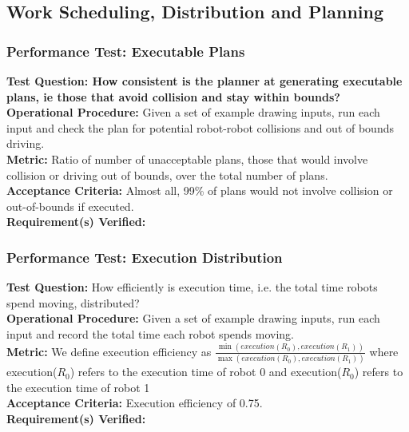 
\subsection{Work Scheduling, Distribution and Planning}
\label{sec:verification_sdp}

\subsubsection{Performance Test: Executable Plans}
\label{sec:sdp_pt_executable}
\textbf{Test Question: How consistent is the planner at generating executable plans, ie those that avoid collision and stay within bounds?} \\
\textbf{Operational Procedure:} Given a set of example drawing inputs, run each input and check the plan for potential robot-robot collisions and out of bounds driving. \\
\textbf{Metric:} Ratio of number of unacceptable plans, those that would involve collision or driving out of bounds, over the total number of plans. \\
\textbf{Acceptance Criteria:} Almost all, 99\% of plans would not involve collision or out-of-bounds if executed. \\
\textbf{Requirement(s) Verified:} 

\subsubsection{Performance Test: Execution Distribution}
\label{sec:sdp_pt_execu}
\textbf{Test Question:} How efficiently is execution time, i.e. the total time robots spend moving, distributed?\\
\textbf{Operational Procedure:} Given a set of example drawing inputs, run each input and record the total time each robot spends moving. \\
\textbf{Metric:} We define execution efficiency as $\frac{\min(execution(R_{0}), execution(R_{1}))}{\max(execution(R_{0}), execution(R_{1}))}$ where execution($R_{0}$) refers to the execution time of robot 0 and execution($R_{0}$) refers to the execution time of robot 1\\
\textbf{Acceptance Criteria:} Execution efficiency of 0.75.\\
\textbf{Requirement(s) Verified:} 

